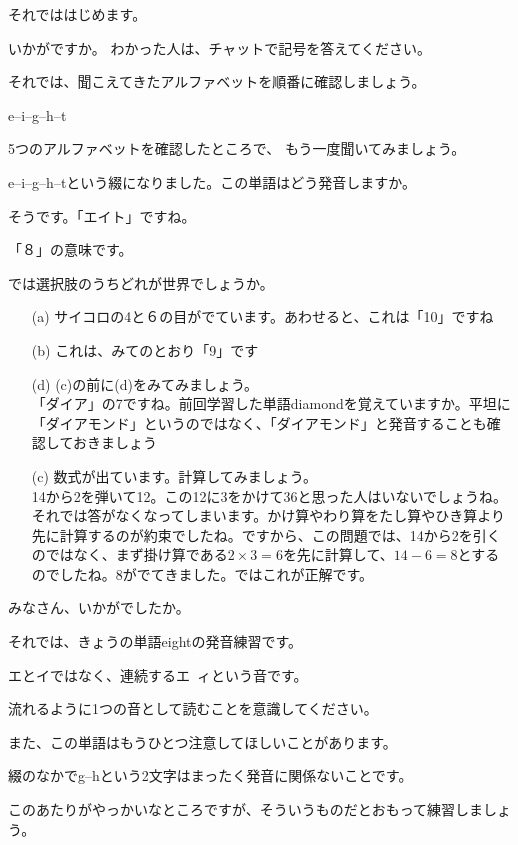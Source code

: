 \documentclass[book,jafontscale=0.9247]{jlreq}
\begin{document}
それでははじめます。

いかがですか。
わかった人は、チャットで記号を答えてください。



それでは、聞こえてきたアルファベットを順番に確認しましょう。{\large \ComputerMouse}

e--i--g--h--t

5つのアルファベットを確認したところで、
もう一度聞いてみましょう。


{\large \ComputerMouse}

e--i--g--h--tという綴になりました。この単語はどう発音しますか。

そうです。「エイト」ですね。

「８」の意味です。

では選択肢のうちどれが世界でしょうか。

\begin{itemize}
 \item[(a)] サイコロの4と６の目がでています。あわせると、これは「10」ですね
 \item[(b)] これは、みてのとおり「9」です
 \item[(d)] (c)の前に(d)をみてみましょう。\\
「ダイア」の7ですね。前回学習した単語diamondを覚えていますか。平坦に「ダイアモンド」というのではなく、「{\gtfamily ダ}イアモンド」と発音することも確認しておきましょう
 \item[(c)] 数式が出ています。計算してみましょう。\\
14から2を弾いて12。この12に3をかけて36と思った人はいないでしょうね。それでは答がなくなってしまいます。かけ算やわり算をたし算やひき算より先に計算するのが約束でしたね。ですから、この問題では、14から2を引くのではなく、まず掛け算である$2\times{3}=6$を先に計算して、$14-6=8$とするのでしたね。8がでてきました。ではこれが正解です。
\end{itemize}

みなさん、いかがでしたか。

それでは、きょうの単語eightの発音練習です。

エとイではなく、連続するエ~ィという音です。

流れるように1つの音として読むことを意識してください。

また、この単語はもうひとつ注意してほしいことがあります。

綴のなかでg--hという2文字はまったく発音に関係ないことです。

このあたりがやっかいなところですが、そういうものだとおもって練習しましょう。
\end{document}
